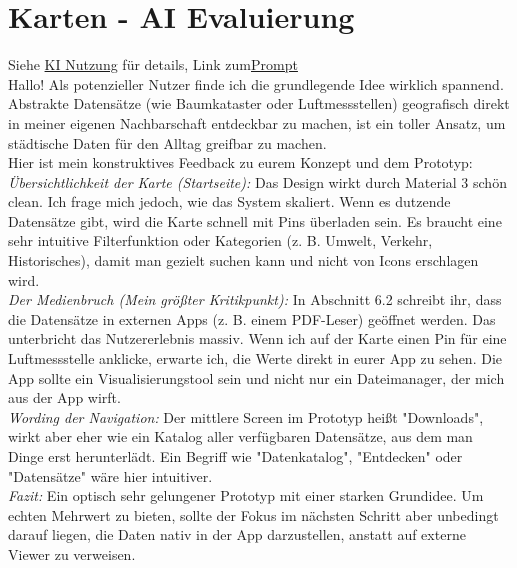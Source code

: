 \section{Karten - AI Evaluierung}
Siehe \href{sec:KI}{KI Nutzung} für details, Link zum\href{https://gemini.google.com/share/b40061c4f3a6}{Prompt}\\

\noindent
Hallo! Als potenzieller Nutzer finde ich die grundlegende Idee wirklich spannend. Abstrakte Datensätze (wie Baumkataster oder Luftmessstellen) geografisch direkt in meiner eigenen Nachbarschaft entdeckbar zu machen, ist ein toller Ansatz, um städtische Daten für den Alltag greifbar zu machen.
\\

\noindent
Hier ist mein konstruktives Feedback zu eurem Konzept und dem Prototyp:
\\

\noindent
    \emph{Übersichtlichkeit der Karte (Startseite):} Das Design wirkt durch Material 3 schön clean. Ich frage mich jedoch, wie das System skaliert. Wenn es dutzende Datensätze gibt, wird die Karte schnell mit Pins überladen sein. Es braucht eine sehr intuitive Filterfunktion oder Kategorien (z. B. Umwelt, Verkehr, Historisches), damit man gezielt suchen kann und nicht von Icons erschlagen wird.
\\

\noindent
    \emph{Der Medienbruch (Mein größter Kritikpunkt):} In Abschnitt 6.2 schreibt ihr, dass die Datensätze in externen Apps (z. B. einem PDF-Leser) geöffnet werden. Das unterbricht das Nutzererlebnis massiv. Wenn ich auf der Karte einen Pin für eine Luftmessstelle anklicke, erwarte ich, die Werte direkt in eurer App zu sehen. Die App sollte ein Visualisierungstool sein und nicht nur ein Dateimanager, der mich aus der App wirft.
\\

\noindent
    \emph{Wording der Navigation:} Der mittlere Screen im Prototyp heißt "Downloads", wirkt aber eher wie ein Katalog aller verfügbaren Datensätze, aus dem man Dinge erst herunterlädt. Ein Begriff wie "Datenkatalog", "Entdecken" oder "Datensätze" wäre hier intuitiver.
\\

\noindent
\emph{Fazit:} Ein optisch sehr gelungener Prototyp mit einer starken Grundidee. Um echten Mehrwert zu bieten, sollte der Fokus im nächsten Schritt aber unbedingt darauf liegen, die Daten nativ in der App darzustellen, anstatt auf externe Viewer zu verweisen.